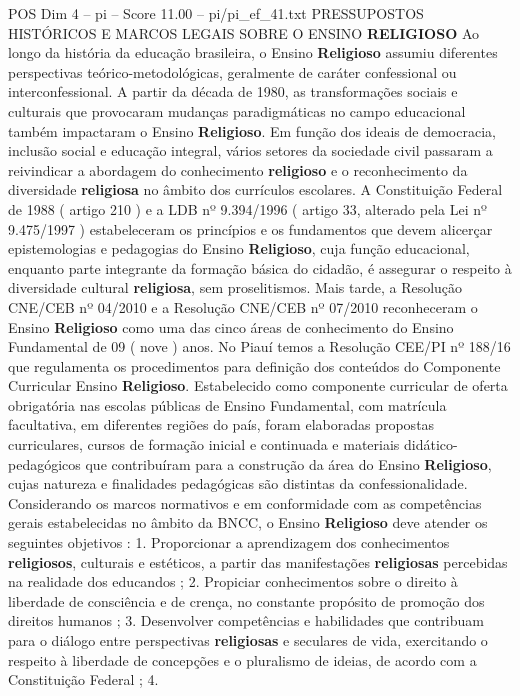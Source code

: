 \begin{textsample}{POS Dim 4 – pi – Score 11.00 – pi/pi\_ef\_41.txt}  \label{ex:f4_pos_125}
PRESSUPOSTOS HISTÓRICOS E MARCOS LEGAIS SOBRE O ENSINO \textbf{RELIGIOSO} Ao longo da história da educação brasileira, o Ensino \textbf{Religioso} assumiu diferentes perspectivas teórico-metodológicas, geralmente de caráter confessional ou interconfessional.
A partir da década de 1980, as transformações sociais e culturais que provocaram mudanças paradigmáticas no campo educacional também impactaram o Ensino \textbf{Religioso}.
Em função dos ideais de democracia, inclusão social e educação integral, vários setores da sociedade civil passaram a reivindicar a abordagem do conhecimento \textbf{religioso} e o reconhecimento da diversidade \textbf{religiosa} no âmbito dos currículos escolares.
A Constituição Federal de 1988 ( artigo 210 ) e a LDB nº 9.394/1996 ( artigo 33, alterado pela Lei nº 9.475/1997 ) estabeleceram os princípios e os fundamentos que devem alicerçar epistemologias e pedagogias do Ensino \textbf{Religioso}, cuja função educacional, enquanto parte integrante da formação básica do cidadão, é assegurar o respeito à diversidade cultural \textbf{religiosa}, sem proselitismos.
Mais tarde, a Resolução CNE/CEB nº 04/2010 e a Resolução CNE/CEB nº 07/2010 reconheceram o Ensino \textbf{Religioso} como uma das cinco áreas de conhecimento do Ensino Fundamental de 09 ( nove ) anos.
No Piauí temos a Resolução CEE/PI nº 188/16 que regulamenta os procedimentos para definição dos conteúdos do Componente Curricular Ensino \textbf{Religioso}.
Estabelecido como componente curricular de oferta obrigatória nas escolas públicas de Ensino Fundamental, com matrícula facultativa, em diferentes regiões do país, foram elaboradas propostas curriculares, cursos de formação inicial e continuada e materiais didático-pedagógicos que contribuíram para a construção da área do Ensino \textbf{Religioso}, cujas natureza e finalidades pedagógicas são distintas da confessionalidade.
Considerando os marcos normativos e em conformidade com as competências gerais estabelecidas no âmbito da BNCC, o Ensino \textbf{Religioso} deve atender os seguintes objetivos : 1.
Proporcionar a aprendizagem dos conhecimentos \textbf{religiosos}, culturais e estéticos, a partir das manifestações \textbf{religiosas} percebidas na realidade dos educandos ; 2.
Propiciar conhecimentos sobre o direito à liberdade de consciência e de crença, no constante propósito de promoção dos direitos humanos ; 3.
Desenvolver competências e habilidades que contribuam para o diálogo entre perspectivas \textbf{religiosas} e seculares de vida, exercitando o respeito à liberdade de concepções e o pluralismo de ideias, de acordo com a Constituição Federal ; 4.

\end{textsample}
